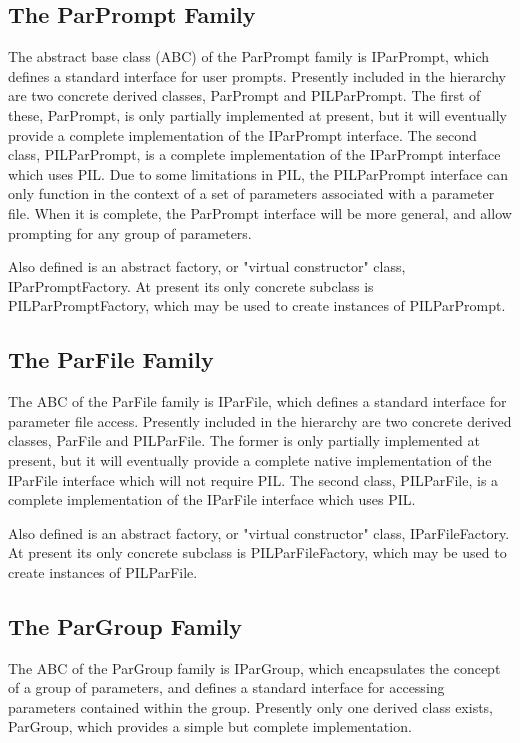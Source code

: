 \subsection{The ParPrompt Family}
The abstract base class (ABC) of the ParPrompt family
is IParPrompt, which defines a standard interface for
user prompts. Presently included in the hierarchy
are two concrete derived classes, ParPrompt and
PILParPrompt. The first of these, ParPrompt, is
only partially implemented at present, but it will
eventually provide a complete implementation of the
IParPrompt interface. The second class, PILParPrompt,
is a complete implementation of the IParPrompt interface
which uses PIL. Due to some limitations in PIL, the
PILParPrompt interface can only function in the context
of a set of parameters associated with a parameter file.
When it is complete, the ParPrompt interface will be
more general, and allow prompting for any group of
parameters.

Also defined is an abstract factory, or "virtual constructor"
class, IParPromptFactory. At present its only concrete
subclass is PILParPromptFactory, which may be used to
create instances of PILParPrompt.

\subsection{The ParFile Family}
The ABC of the ParFile family is IParFile, which defines
a standard interface for parameter file access. Presently
included in the hierarchy are two concrete derived classes,
ParFile and PILParFile. The former is only partially
implemented at present, but it will eventually provide a
complete native implementation of the IParFile interface
which will not require PIL. The second class, PILParFile,
is a complete implementation of the IParFile interface which
uses PIL.

Also defined is an abstract factory, or "virtual constructor"
class, IParFileFactory. At present its only concrete
subclass is PILParFileFactory, which may be used to
create instances of PILParFile.

\subsection{The ParGroup Family}
The ABC of the ParGroup family is IParGroup, which
encapsulates the concept of a group of parameters, and
defines a standard interface for accessing parameters
contained within the group. Presently only one derived
class exists, ParGroup, which provides a simple but
complete implementation.

